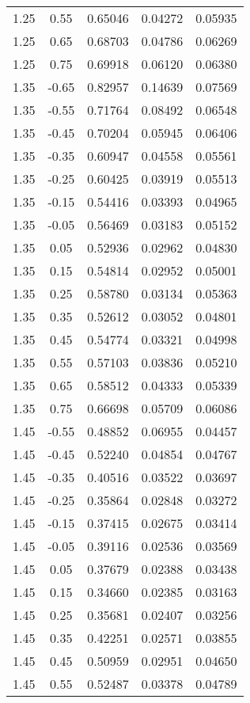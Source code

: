 \begin{longtable}{ccccc}
1.25 & 0.55 & 0.65046 & 0.04272 & 0.05935 \\ 
1.25 & 0.65 & 0.68703 & 0.04786 & 0.06269 \\ 
1.25 & 0.75 & 0.69918 & 0.06120 & 0.06380 \\ \hline
1.35 & -0.65 & 0.82957 & 0.14639 & 0.07569 \\ 
1.35 & -0.55 & 0.71764 & 0.08492 & 0.06548 \\ 
1.35 & -0.45 & 0.70204 & 0.05945 & 0.06406 \\ 
1.35 & -0.35 & 0.60947 & 0.04558 & 0.05561 \\ 
1.35 & -0.25 & 0.60425 & 0.03919 & 0.05513 \\ 
1.35 & -0.15 & 0.54416 & 0.03393 & 0.04965 \\ 
1.35 & -0.05 & 0.56469 & 0.03183 & 0.05152 \\ 
1.35 & 0.05 & 0.52936 & 0.02962 & 0.04830 \\ 
1.35 & 0.15 & 0.54814 & 0.02952 & 0.05001 \\ 
1.35 & 0.25 & 0.58780 & 0.03134 & 0.05363 \\ 
1.35 & 0.35 & 0.52612 & 0.03052 & 0.04801 \\ 
1.35 & 0.45 & 0.54774 & 0.03321 & 0.04998 \\ 
1.35 & 0.55 & 0.57103 & 0.03836 & 0.05210 \\ 
1.35 & 0.65 & 0.58512 & 0.04333 & 0.05339 \\ 
1.35 & 0.75 & 0.66698 & 0.05709 & 0.06086 \\ \hline
1.45 & -0.55 & 0.48852 & 0.06955 & 0.04457 \\ 
1.45 & -0.45 & 0.52240 & 0.04854 & 0.04767 \\ 
1.45 & -0.35 & 0.40516 & 0.03522 & 0.03697 \\ 
1.45 & -0.25 & 0.35864 & 0.02848 & 0.03272 \\ 
1.45 & -0.15 & 0.37415 & 0.02675 & 0.03414 \\ 
1.45 & -0.05 & 0.39116 & 0.02536 & 0.03569 \\ 
1.45 & 0.05 & 0.37679 & 0.02388 & 0.03438 \\ 
1.45 & 0.15 & 0.34660 & 0.02385 & 0.03163 \\ 
1.45 & 0.25 & 0.35681 & 0.02407 & 0.03256 \\ 
1.45 & 0.35 & 0.42251 & 0.02571 & 0.03855 \\ 
1.45 & 0.45 & 0.50959 & 0.02951 & 0.04650 \\ 
1.45 & 0.55 & 0.52487 & 0.03378 & 0.04789 \\ 

\end{longtable}
